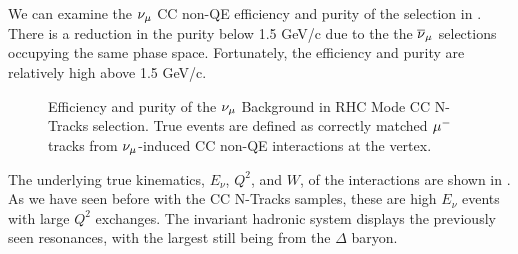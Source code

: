 We can examine the $\numu$ CC non-QE efficiency and purity of the
selection in . There is a
reduction in the purity below 1.5 GeV/c due to the the $\overline{\nu}_{\mu}$
selections occupying the same phase space. Fortunately, the efficiency
and purity are relatively high above 1.5 GeV/c.

\begin{figure}
\begin{centering}
\par\end{centering}
\caption[Efficiency and Purity of the $\numu$ Background in RHC Mode CC N-Tracks
Selection]{Efficiency and purity of the $\protect\nu_{\mu}$ Background in RHC Mode
CC N-Tracks selection. True events are defined as correctly matched
$\protect\mu^{-}$ tracks from $\protect\nu_{\mu}$-induced CC non-QE
interactions at the vertex. \label{fig:numuRHCCCNTrkRecoEffPur}}
\end{figure}

The underlying true kinematics, $E_{\nu}$, $Q^{2}$, and $W$, of
the interactions are shown in .
As we have seen before with the CC N-Tracks samples, these are high
$E_{\nu}$ events with large $Q^{2}$ exchanges. The invariant hadronic
system displays the previously seen resonances, with the largest still
being from the $\Delta$ baryon.

